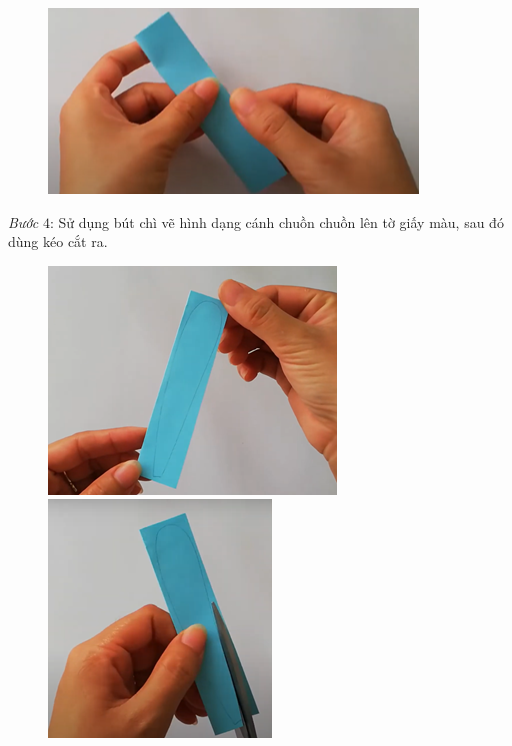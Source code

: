 \begin{multicols}{2}
\begin{figure}[H]
		\vspace*{1pt}
		\includegraphics[width=0.7\linewidth]{68}
		\vspace*{-10pt}
	\end{figure}
	\textit{Bước} $4$: Sử dụng bút chì vẽ hình dạng cánh chuồn chuồn lên tờ giấy màu, sau đó dùng kéo cắt ra.
	\begin{figure}[H]
		\vspace*{-5pt}
		\centering
		\captionsetup{labelformat= empty, justification=centering}
		\includegraphics[height=0.31\linewidth]{69}
		\includegraphics[height=0.31\linewidth]{70}
		

\end{figure}
\end{multicols}
